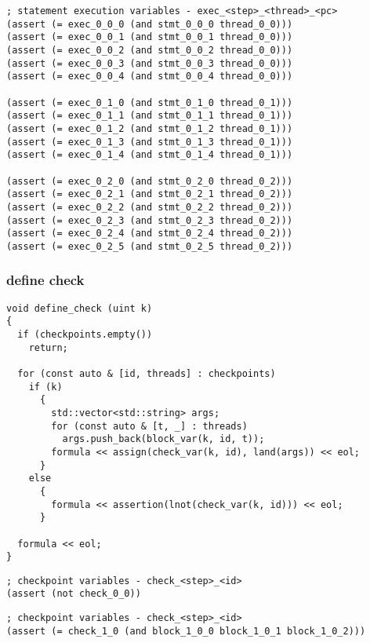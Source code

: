 \begin{lstlisting}[language=SMTLib]
; statement execution variables - exec_<step>_<thread>_<pc>
(assert (= exec_0_0_0 (and stmt_0_0_0 thread_0_0)))
(assert (= exec_0_0_1 (and stmt_0_0_1 thread_0_0)))
(assert (= exec_0_0_2 (and stmt_0_0_2 thread_0_0)))
(assert (= exec_0_0_3 (and stmt_0_0_3 thread_0_0)))
(assert (= exec_0_0_4 (and stmt_0_0_4 thread_0_0)))

(assert (= exec_0_1_0 (and stmt_0_1_0 thread_0_1)))
(assert (= exec_0_1_1 (and stmt_0_1_1 thread_0_1)))
(assert (= exec_0_1_2 (and stmt_0_1_2 thread_0_1)))
(assert (= exec_0_1_3 (and stmt_0_1_3 thread_0_1)))
(assert (= exec_0_1_4 (and stmt_0_1_4 thread_0_1)))

(assert (= exec_0_2_0 (and stmt_0_2_0 thread_0_2)))
(assert (= exec_0_2_1 (and stmt_0_2_1 thread_0_2)))
(assert (= exec_0_2_2 (and stmt_0_2_2 thread_0_2)))
(assert (= exec_0_2_3 (and stmt_0_2_3 thread_0_2)))
(assert (= exec_0_2_4 (and stmt_0_2_4 thread_0_2)))
(assert (= exec_0_2_5 (and stmt_0_2_5 thread_0_2)))
\end{lstlisting}

\subsubsection{define check}

\begin{lstlisting}[style=c++]
void define_check (uint k)
{
  if (checkpoints.empty())
    return;

  for (const auto & [id, threads] : checkpoints)
    if (k)
      {
        std::vector<std::string> args;
        for (const auto & [t, _] : threads)
          args.push_back(block_var(k, id, t));
        formula << assign(check_var(k, id), land(args)) << eol;
      }
    else
      {
        formula << assertion(lnot(check_var(k, id))) << eol;
      }

  formula << eol;
}
\end{lstlisting}

\begin{lstlisting}[language=SMTLib]
; checkpoint variables - check_<step>_<id>
(assert (not check_0_0))
\end{lstlisting}

\begin{lstlisting}[language=SMTLib]
; checkpoint variables - check_<step>_<id>
(assert (= check_1_0 (and block_1_0_0 block_1_0_1 block_1_0_2)))
\end{lstlisting}

